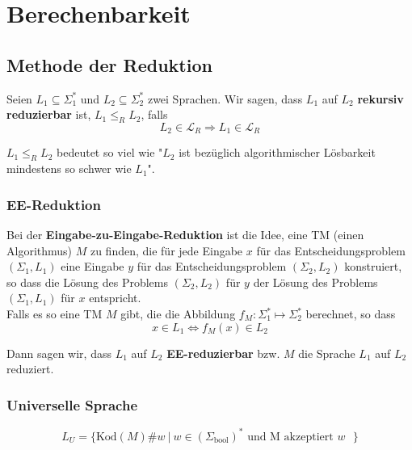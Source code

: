 \documentclass[11pt]{article}
\begin{document}
\section{Berechenbarkeit}

\subsection{Methode der Reduktion}

Seien $L_1 \subseteq \Sigma_1^*$ und $L_2 \subseteq \Sigma_2^*$ zwei Sprachen. Wir sagen, dass $L_1$ auf $L_2$ \textbf{rekursiv reduzierbar} ist, $L_1 \leq_R L_2$, falls
\begin{equation*}
	L_2 \in \mathcal{L}_R \Rightarrow L_1 \in \mathcal{L}_R
\end{equation*}

$L_1 \leq_R L_2$ bedeutet so viel wie "$L_2$ ist bez{\"u}glich algorithmischer L{\"o}sbarkeit mindestens so schwer wie $L_1$".

\subsubsection{EE-Reduktion}

Bei der \textbf{Eingabe-zu-Eingabe-Reduktion} ist die Idee, eine TM (einen Algorithmus) $M$ zu finden, die f{\"u}r jede Eingabe $x$ f{\"u}r das Entscheidungsproblem $(\Sigma_1,L_1)$ eine Eingabe $y$ f{\"u}r das Entscheidungsproblem $(\Sigma_2,L_2)$ konstruiert, so dass die L{\"o}sung des Problems $(\Sigma_2,L_2)$ f{\"u}r $y$ der L{\"o}sung des Problems $(\Sigma_1,L_1)$ f{\"u}r $x$ entspricht. \\

Falls es so eine TM $M$ gibt, die die Abbildung $f_M: \Sigma_1^*\mapsto\Sigma_2^*$ berechnet, so dass
\begin{equation*}
	x \in L_1 \Leftrightarrow f_M(x) \in L_2
\end{equation*}

Dann sagen wir, dass $L_1$ auf $L_2$ \textbf{EE-reduzierbar} bzw. $M$ die Sprache $L_1$ auf $L_2$ reduziert.

\subsubsection{Universelle Sprache}

\begin{equation*}
	L_U = \{\text{Kod}(M)\#w\ |\ w \in (\Sigma_\text{bool})^* \text{ und M akzeptiert $w$ }\}
\end{equation*}
\end{document}
